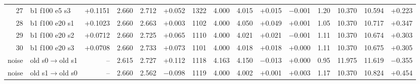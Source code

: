 \documentclass[10pt,a4paper]{article}
\begin{document}
\begin{landscape}
\begin{table}[h!]
\begin{tabular}{rlrrrrrrrrrrrrr}
27 & b1 f100 e5 s3 & +0.1151 & 2.660 & 2.712 & +0.052 & 1322 & 4.000 & 4.015 & +0.015 & $-$0.001 & 1.20 & 10.370 & 10.594 & +0.223\\
28 & b1 f100 e20 s1 & +0.1023 & 2.660 & 2.663 & +0.003 & 1102 & 4.000 & 4.050 & +0.049 & +0.001 & 1.05 & 10.370 & 10.717 & +0.347\\
29 & b1 f100 e20 s2 & +0.0712 & 2.660 & 2.725 & +0.065 & 1110 & 4.000 & 4.021 & +0.021 & $-$0.001 & 1.11 & 10.370 & 10.674 & +0.303\\
30 & b1 f100 e20 s3 & +0.0708 & 2.660 & 2.733 & +0.073 & 1101 & 4.000 & 4.018 & +0.018 & +0.000 & 1.11 & 10.370 & 10.675 & +0.305\\
\midrule
noise & old s0$\rightarrow$old s1 & -- & 2.615 & 2.727 & +0.112 & 1118 & 4.163 & 4.150 & $-$0.013 & +0.000 & 0.95 & 11.975 & 11.619 & $-$0.355\\
noise & old s1$\rightarrow$old s0 & -- & 2.660 & 2.562 & $-$0.098 & 1119 & 4.000 & 4.002 & +0.001 & +0.003 & 1.17 & 10.370 & 10.824 & +0.454\\
\bottomrule\end{tabular}\end{table}\end{landscape}
\end{document}
